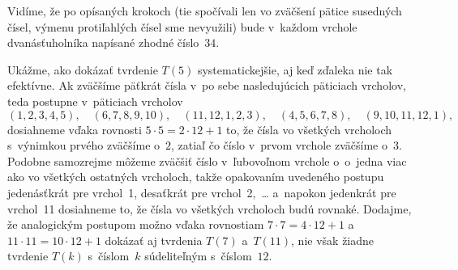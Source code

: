{Vidíme, že po opísaných krokoch (tie spočívali len vo zväčšení pätice
susedných čísel, výmenu protiľahlých čísel sme nevyužili) bude
v~každom vrchole dvanásťuholníka napísané zhodné číslo~$34$.

\poznamka
Ukážme, ako dokázať tvrdenie $T(5)$ systematickejšie, aj keď zďaleka nie tak efektívne.
Ak zväčšíme päťkrát čísla v~po sebe nasledujúcich päticiach vrcholov,
teda postupne v~päticiach vrcholov
$$
(1,2,3,4,5),\quad
(6,7,8,9,10),\quad
(11,12,1,2,3),\quad
(4,5,6,7,8),\quad
(9,10,11,12,1),
$$
dosiahneme vďaka rovnosti $5\cdot5=2\cdot12+1$ to,
že čísla vo všetkých vrcholoch s~výnimkou prvého zväčšíme
o~$2$, zatiaľ čo číslo v~prvom vrchole zväčšíme o~$3$. Podobne samozrejme môžeme zväčšiť
číslo v~ľubovoľnom vrchole o~o~jedna viac ako vo všetkých ostatných vrcholoch, takže opakovaním
uvedeného postupu jedenásťkrát pre vrchol~1, desaťkrát pre vrchol~2,~\dots{}
a~napokon jedenkrát pre vrchol~11 dosiahneme to, že čísla vo všetkých vrcholoch budú rovnaké.
Dodajme, že analogickým postupom možno vďaka rovnostiam $7\cdot7=4\cdot12+1$
a~$11\cdot11=10\cdot12+1$ dokázať aj tvrdenia $T(7)$ a~$T(11)$, nie však
žiadne tvrdenie $T(k)$ s~číslom~$k$ súdeliteľným s~číslom~$12$.


%
%


}
